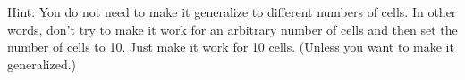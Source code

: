 \documentclass[
  letterpaper,
  DIV=11,
  numbers=noendperiod]{scrartcl}
\begin{document}
\begin{enumerate}
\begin{enumerate}
    Hint: You do not need to make it generalize to different numbers of
    cells. In other words, don't try to make it work for an arbitrary
    number of cells and then set the number of cells to 10. Just make it
    work for 10 cells. (Unless you want to make it generalized.)
  \end{enumerate}
\end{enumerate}
\end{document}
